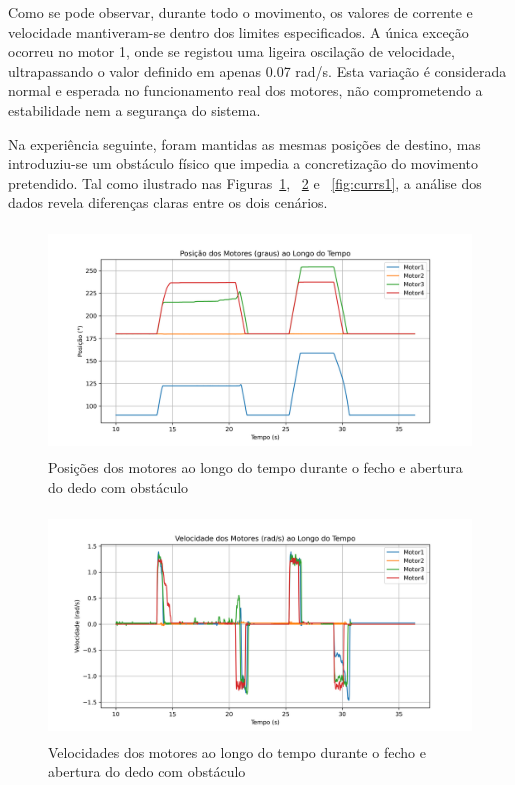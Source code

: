 Como se pode observar, durante todo o movimento, os valores de corrente e velocidade mantiveram-se dentro dos limites especificados. A única exceção ocorreu no motor 1, onde se registou uma ligeira oscilação de velocidade, ultrapassando o valor definido em apenas 0.07 rad/s. Esta variação é considerada normal e esperada no funcionamento real dos motores, não comprometendo a estabilidade nem a segurança do sistema.

Na experiência seguinte, foram mantidas as mesmas posições de destino, mas introduziu-se um obstáculo físico que impedia a concretização do movimento pretendido. Tal como ilustrado nas Figuras~\ref{fig:pos1}, ~\ref{fig:vels1} e ~\ref{fig:currs1}, a análise dos dados revela diferenças claras entre os dois cenários. 

\begin{figure}[H]
    \centering
    \includegraphics[height=6cm]{figs/chapter4/finger_positions_1.png}
    \caption{Posições dos motores ao longo do tempo durante o fecho e abertura do dedo com obstáculo}
    \label{fig:pos1}
    
\end{figure}
\begin{figure}[H]
    \centering
    \includegraphics[height=6cm]{figs/chapter4/finger_velocities_1.png}
    \caption{Velocidades dos motores ao longo do tempo durante o fecho e abertura do dedo com obstáculo}
    \label{fig:vels1}
    
\end{figure}
